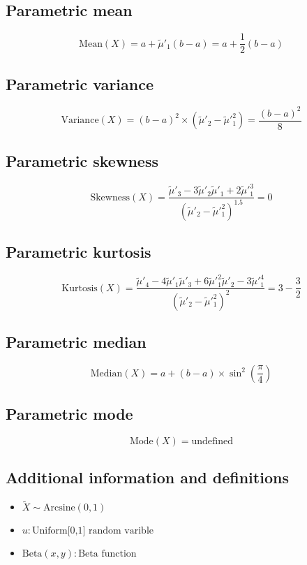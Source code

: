 \documentclass{article}
\begin{document}
\subsection{Parametric mean}
\begin{equation*} \mathrm{Mean}(X)=a+\tilde{\mu}'_{1}\left(b-a\right)= a+\frac{1}{2}\left(b-a\right) \end{equation*}
\subsection{Parametric variance}
\begin{equation*} \mathrm{Variance}(X)=\left(b-a\right)^{2}\times (\tilde{\mu}'_{2}-\tilde{\mu}'^{2}_{1})=\frac{\left(b-a\right)^{2}}{8} \end{equation*}
\subsection{Parametric skewness}
\begin{equation*} \mathrm{Skewness}(X)=\frac{\tilde{\mu}'_{3}-3\tilde{\mu}'_{2}\tilde{\mu}'_{1}+2\tilde{\mu}'^{3}_{1}}{(\tilde{\mu}'_{2}-\tilde{\mu}'^{2}_{1})^{1.5}}=0 \end{equation*}
\subsection{Parametric kurtosis}
\begin{equation*} \mathrm{Kurtosis}(X)=\frac{\tilde{\mu}'_{4}-4\tilde{\mu}'_{1}\tilde{\mu}'_{3}+6\tilde{\mu}'^{2}_{1}\tilde{\mu}'_{2}-3\tilde{\mu}'^{4}_{1}}{(\tilde{\mu}'_{2}-\tilde{\mu}'^{2}_{1})^{2}}=3-\frac{3}{2} \end{equation*}
\subsection{Parametric median}
\begin{equation*} \mathrm{Median}(X)=a+\left(b-a\right)\times \sin^{2}\left(\frac{\pi}{4}\right) \end{equation*}
\subsection{Parametric mode}
\begin{equation*} \mathrm{Mode}(X)=\text{undefined} \end{equation*}
\subsection{Additional information and definitions}
\begin{itemize}
    \item $ \tilde{X}\sim \mathrm{Arcsine}\left(0,1\right) $
    \item $ u:\text{Uniform[0,1] random varible} $
    \item $ \text{Beta}\left(x,y\right):\text{Beta function} $
\end{itemize}
\end{document}
